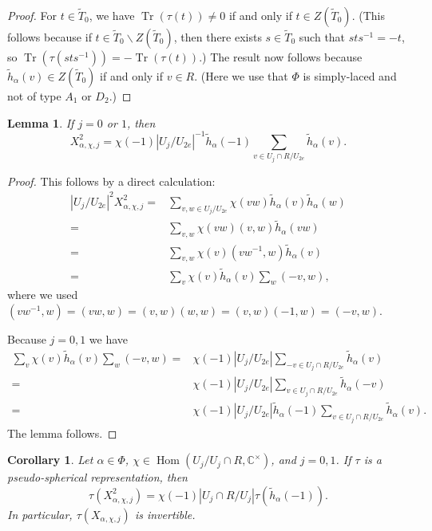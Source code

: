 \documentclass[10pt, letterpaper]{amsart}
\theoremstyle{plain}
\newtheorem{Cor}[equation]{Corollary}
\newtheorem{Lem}[equation]{Lemma}
\theoremstyle{definition}
\numberwithin{equation}{section}
\newcommand{\htt}{\tilde{h}}
\newcommand{\Tt}{\widetilde{T}}
\newcommand{\Hom}{\operatorname{Hom}}
\newcommand{\Tr}{\operatorname{Tr}}
\begin{document}
\begin{proof}
	For $t\in \Tt_{0}$, we have $\Tr(\tau(t))\neq 0$ if and only if $t\in Z(\Tt_{0})$. (This follows because if $t\in\Tt_0\smallsetminus Z(\Tt_0)$, then there exists $s\in\Tt_0$ such that $sts^{-1}=-t$, so $\Tr(\tau(sts^{-1}))=-\Tr(\tau(t))$.) The result now follows because $\htt_{\alpha}(v)\in Z(\Tt_{0})$ if and only if $v\in R$. (Here we use that $\Phi$ is simply-laced and not of type $A_{1}$ or $D_2$.)
\end{proof}

\begin{Lem} If $j=0$ or $1$, then
	\begin{equation*}
		X_{\alpha,\chi,j}^{2}=\chi(-1)|U_{j}/U_{2e}|^{-1}\htt_{\alpha}(-1)\sum_{v\in U_{j}\cap R/U_{2e}}\htt_{\alpha}(v).
	\end{equation*}
\end{Lem}

\begin{proof} This follows by a direct calculation:
	\begin{align*}
		\left|U_j/U_{2e}\right|^{2}X_{\alpha,\chi,j}^{2}=&\sum_{v,w\in U_{j}/U_{2e}}\chi(vw)\htt_{\alpha}(v)\htt_{\alpha}(w)\\
		=&\sum_{v,w}\chi(vw)(v,w)\htt_{\alpha}(vw)\\
		=&\sum_{v,w}\chi(v)(vw^{-1},w)\htt_{\alpha}(v)\\
		=&\sum_{v}\chi(v)\htt_{\alpha}(v)\sum_{w}(-v,w),
	\end{align*}
where we used $(vw^{-1}, w)=(vw,w)=(v, w)(w, w)=(v, w)(-1, w)=(-v, w)$.

	Because $j=0,1$ we have
	\begin{align*}
		\sum_{v}\chi(v)\htt_{\alpha}(v)\sum_{w}(-v,w)=&\chi(-1)|U_{j}/U_{2e}|\sum_{-v\in U_{j}\cap R/U_{2e}}\htt_{\alpha}(v)\\
		=&\chi(-1)|U_{j}/U_{2e}|\sum_{v\in U_{j}\cap R/U_{2e}}\htt_{\alpha}(-v)\\
		=&\chi(-1)|U_{j}/U_{2e}|\htt_{\alpha}(-1)\sum_{v\in U_{j}\cap R/U_{2e}}\htt_{\alpha}(v).
	\end{align*}
    The lemma follows.
\end{proof}

\begin{Cor}\label{XInvert}
	Let $\alpha\in\Phi$, $\chi\in \Hom(U_{j}/U_{j}\cap R,\mathbb{C}^{\times})$, and $j=0,1$. If $\tau$ is a pseudo-spherical representation, then
	\begin{equation*}
		\tau(X_{\alpha,\chi,j}^{2}) = \chi(-1)|U_{j}\cap R/U_{j}|\tau(\htt_{\alpha}(-1)).
	\end{equation*} 
In particular, $\tau(X_{\alpha,\chi,j})$ is invertible.
\end{Cor}
\end{document}
